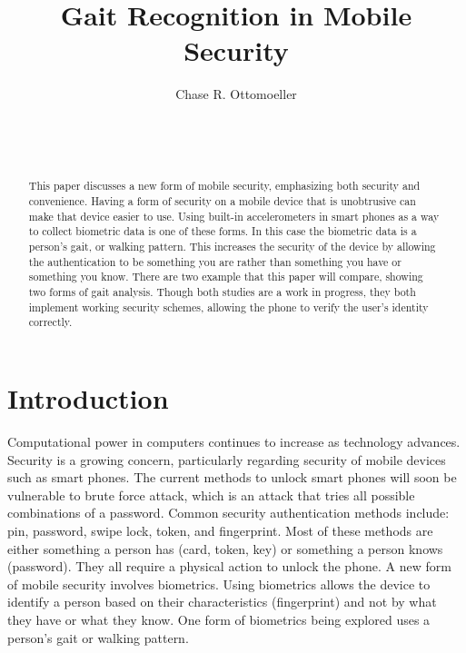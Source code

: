 \documentclass{sig-alternate}
\begin{document}

\title{Gait Recognition in Mobile Security}


\author{
\alignauthor
Chase R. Ottomoeller\\
	\\
	\\
	\\
}

\maketitle




\begin{abstract}
This paper discusses a new form of mobile security, emphasizing both security and convenience. Having a form of security on a mobile device that is unobtrusive can make that device easier to use. Using built-in accelerometers in smart phones as a way to collect biometric data is one of these forms. In this case the biometric data is a person's gait, or walking pattern. This increases the security of the device by allowing the authentication to be something you are rather than something you have or something you know. There are two example that this paper will compare, showing two forms of gait analysis. Though both studies are a work in progress, they both implement working security schemes, allowing the phone to  verify the user's identity correctly.  
\end{abstract}




\section{Introduction}
	Computational power in computers continues to increase as technology advances. Security is a growing concern, particularly regarding security of mobile devices such as smart phones. The current methods to unlock smart phones will soon be vulnerable to brute force  attack, which is an attack that tries all possible combinations of a password. Common security authentication methods include: pin, password, swipe lock, token, and fingerprint. Most of these methods are either something a person has (card, token, key) or something a person knows (password). They all require a physical action to unlock the phone. A new form of mobile security involves biometrics. Using biometrics allows the device to identify a person based on their characteristics (fingerprint) and not by what they have or what they know.  One form of biometrics being explored uses a person's gait or walking pattern. 
	
\end{document}

